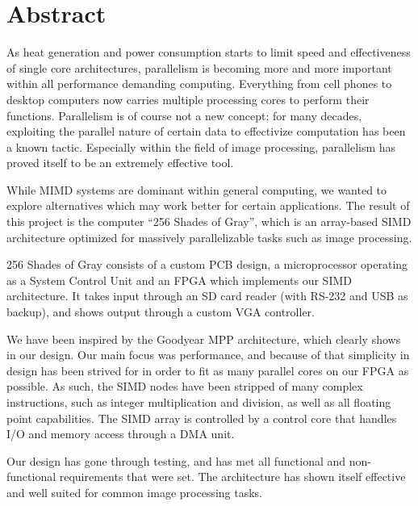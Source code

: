 \begingroup
\let\clearpage\relax
\let\cleardoublepage\relax
\let\cleardoublepage\relax

\chapter*{Abstract}
As heat generation and power consumption starts to limit speed and effectiveness
of single core architectures, parallelism is becoming more and more important
within all performance demanding computing. Everything from cell phones to
desktop computers now carries multiple processing cores to perform their
functions. Parallelism is of course not a new concept; for many decades,
exploiting the parallel nature of certain data to effectivize computation has
been a known tactic. Especially within the field of image processing,
parallelism has proved itself to be an extremely effective tool.

While \ac{MIMD} systems are dominant within general computing, we wanted to
explore alternatives which may work better for certain applications. The result
of this project is the computer ``256 Shades of Gray'', which is an array-based
\ac{SIMD} architecture optimized for massively parallelizable tasks such as
image processing.

256 Shades of Gray consists of a custom PCB design, a microprocessor operating
as a System Control Unit and an FPGA which implements our SIMD architecture. It
takes input through an SD card reader (with RS-232 and USB as backup), and shows
output through a custom VGA controller.

We have been inspired by the Goodyear MPP architecture, which clearly shows in
our design. Our main focus was performance, and because of that simplicity in
design has been strived for in order to fit as many parallel cores on our FPGA
as possible. As such, the SIMD nodes have been stripped of many
complex instructions, such as integer multiplication and division, as well as
all floating point capabilities. The SIMD array is controlled by a control core
that handles I/O and memory access through a DMA unit.

Our design has gone through testing, and has met all functional and
non-functional requirements that were set. The architecture has shown itself
effective and well suited for common image processing tasks.
\endgroup
